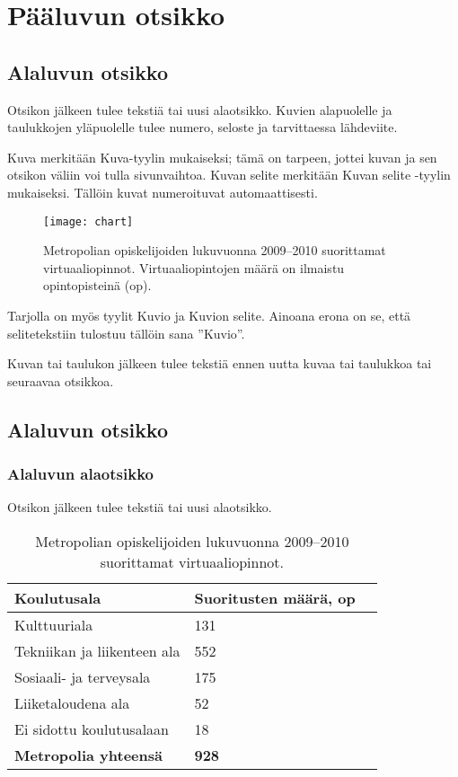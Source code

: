 \chapter{Pääluvun otsikko}

\section{Alaluvun otsikko}
Otsikon jälkeen tulee tekstiä tai uusi alaotsikko. Kuvien alapuolelle ja taulukkojen yläpuolelle tulee numero, seloste ja tarvittaessa lähdeviite.

Kuva merkitään Kuva-tyylin mukaiseksi; tämä on tarpeen, jottei kuvan ja sen otsikon väliin voi tulla sivunvaihtoa. Kuvan selite merkitään Kuvan selite -tyylin mukaiseksi. Tällöin kuvat numeroituvat automaattisesti.

\begin{figure}[h]
  \texttt{[image: chart]}
  \caption{Metropolian opiskelijoiden lukuvuonna 2009–2010 suorittamat virtuaaliopinnot. Virtuaaliopintojen määrä on ilmaistu opintopisteinä (op).}
  \label{fig:chart}
\end{figure}

Tarjolla on myös tyylit Kuvio ja Kuvion selite. Ainoana erona on se, että selitetekstiin tulostuu tällöin sana ”Kuvio”.

Kuvan tai taulukon jälkeen tulee tekstiä ennen uutta kuvaa tai taulukkoa tai seuraavaa otsikkoa.

\section{Alaluvun otsikko}

\subsection{Alaluvun alaotsikko}

Otsikon jälkeen tulee tekstiä tai uusi alaotsikko.

\begin{table}[h]
  \caption{Metropolian opiskelijoiden lukuvuonna 2009–2010 suorittamat virtuaaliopinnot.}
  \begin{tabular}{| l | l | l |}
  \hline
  \bfseries Koulutusala & \bfseries Suoritusten määrä, op \\
  \hline
  Kulttuuriala & 131 \\
  \hline
  Tekniikan ja liikenteen ala & 552 \\
  \hline
  Sosiaali- ja terveysala & 175 \\
  \hline
  Liiketaloudena ala & 52 \\
  \hline
  Ei sidottu koulutusalaan & 18 \\
  \hline
  \bfseries Metropolia yhteensä & \bfseries 928 \\
  \hline
  \end{tabular}
\end{table}

